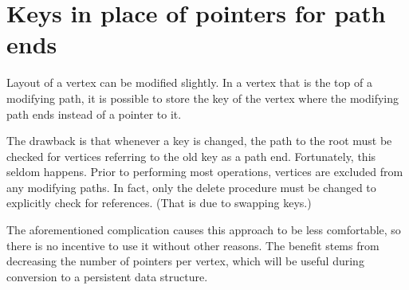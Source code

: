 \section{Keys in place of pointers for path ends}

Layout of a vertex can be modified slightly. In a vertex that is the top of a modifying path, it is possible to store the key of the vertex where the modifying path ends instead of a pointer to it.

The drawback is that whenever a key is changed, the path to the root must be checked for vertices referring to the old key as a path end. Fortunately, this seldom happens. 
Prior to performing most operations, vertices are excluded from any modifying paths. 
In fact, only the delete procedure must be changed to explicitly check for references. (That is due to swapping keys.)

The aforementioned complication causes this approach to be less comfortable, so there is no incentive to use it without other reasons. 
The benefit stems from decreasing the number of pointers per vertex, which will be useful during conversion to a persistent data structure.
